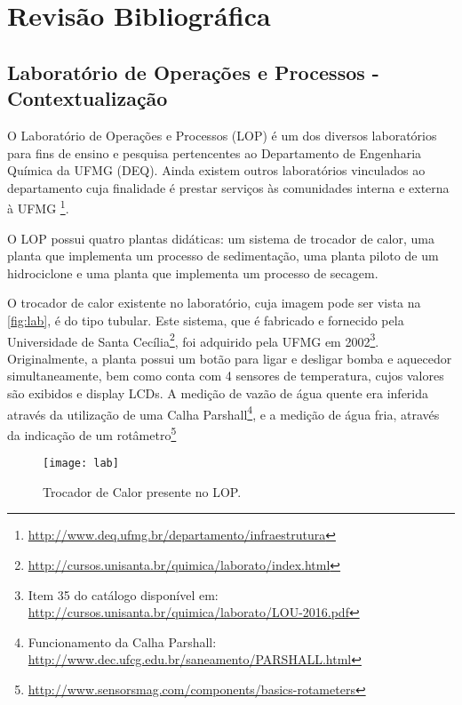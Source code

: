 \chapter{Revisão Bibliográfica}
	
	\section{Laboratório de Operações e Processos - Contextualização}
		O Laboratório de Operações e Processos (LOP) é um dos diversos laboratórios para fins de ensino e pesquisa pertencentes ao Departamento de Engenharia Química da UFMG (DEQ). Ainda existem outros laboratórios vinculados ao departamento cuja finalidade é prestar serviços às comunidades interna e externa à UFMG \footnote{\url{http://www.deq.ufmg.br/departamento/infraestrutura}}.
		
		O LOP possui quatro plantas didáticas: um sistema de trocador de calor, uma planta que implementa um processo de sedimentação, uma planta piloto de um hidrociclone e uma planta que implementa um processo de secagem.
		
		O trocador de calor existente no laboratório, cuja imagem pode ser vista na \autoref{fig:lab}, é do tipo tubular. Este sistema, que é fabricado e fornecido pela Universidade de Santa Cecília\footnote{\url{http://cursos.unisanta.br/quimica/laborato/index.html}}, foi adquirido pela UFMG em 2002\footnote{Item 35 do catálogo disponível em: \url{http://cursos.unisanta.br/quimica/laborato/LOU-2016.pdf}}. Originalmente, a planta possui um botão para ligar e desligar bomba e aquecedor simultaneamente, bem como conta com 4 sensores de temperatura, cujos valores são exibidos e display LCDs. A medição de vazão de água quente era inferida através da utilização de uma Calha Parshall\footnote{Funcionamento da Calha Parshall: \url{http://www.dec.ufcg.edu.br/saneamento/PARSHALL.html}}, e a medição de água fria, através da indicação de um rotâmetro\footnote{\url{http://www.sensorsmag.com/components/basics-rotameters}}
		
		\begin{figure}[!htb]
			\centering
			\texttt{[image: lab]}  %
			\caption{Trocador de Calor presente no LOP.}
			\label{fig:lab}
		\end{figure}

